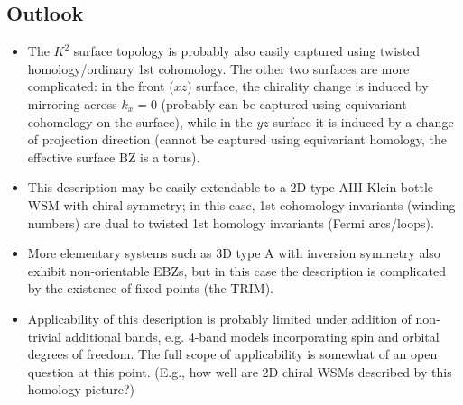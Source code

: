 \subsection{Outlook}

{\color{blue}
\begin{itemize}
	\item The $K^2$ surface topology is probably also easily captured using twisted homology/ordinary 1st cohomology. The other two surfaces are more complicated: in the front ($xz$) surface, the chirality change is induced by mirroring across $k_x=0$ (probably can be captured using equivariant cohomology on the surface), while in the $yz$ surface it is induced by a change of projection direction (cannot be captured using equivariant homology, the effective surface BZ is a torus).
	
	\item This description may be easily extendable to a 2D type AIII Klein bottle WSM with chiral symmetry; in this case, 1st cohomology invariants (winding numbers) are dual to twisted 1st homology invariants (Fermi arcs/loops).
	
	\item More elementary systems such as 3D type A with inversion symmetry also exhibit non-orientable EBZs, but in this case the description is complicated by the existence of fixed points (the TRIM).
	
	\item Applicability of this description is probably limited under addition of non-trivial additional bands, e.g. 4-band models incorporating spin and orbital degrees of freedom. The full scope of applicability is somewhat of an open question at this point. (E.g., how well are 2D chiral WSMs described by this homology picture?)
\end{itemize}
}



